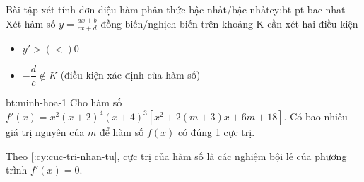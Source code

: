 \begin{chuy}{Bài tập xét tính đơn điệu hàm phân thức bậc nhất/bậc nhất}{cy:bt-pt-bac-nhat}
Xét hàm số $y = \frac{ax + b}{cx +d}$ đồng biến/nghịch biến trên khoảng K cần xét hai điều kiện
\begin{itemize}
    \item $y'> (<) 0$
    \item $-\dfrac{d}{c} \notin K$ \quad (điều kiện xác định của hàm số)
\end{itemize}
\end{chuy}

\begin{cauhoi}{bt:minh-hoa-1}
    Cho hàm số $f'(x) = x^2 (x+2)^4 (x+4)^3 [x^2 + 2(m+3)x + 6m + 18]$.
    Có bao nhiêu giá trị nguyên của $m$ để hàm số $f(x)$ có đúng 1 cực trị.
\end{cauhoi}

\begin{loigiai}
    Theo \ref{:cy:cuc-tri-nhan-tu}, cực trị của hàm số là các nghiệm bội lẻ của phương trình $f'(x) = 0$.
\end{loigiai}